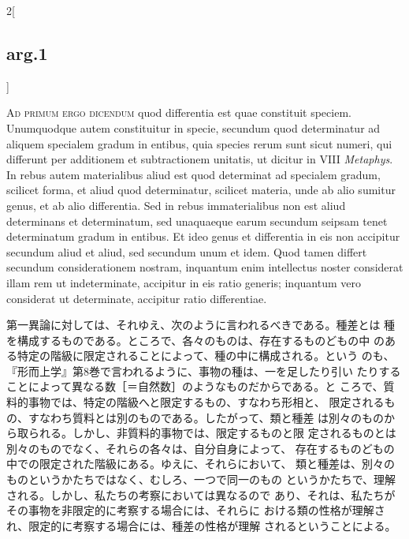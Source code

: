 \documentclass[paper=a4paper,fontsize=10pt,jafontsize=9pt,titlepage]{jlreq}
\begin{document}
\begin{paracol}{2}[\subsection{arg.1}]
\switchcolumn*[\subsection{ad.1}]

{\scshape Ad primum ergo dicendum} quod differentia est quae
 constituit speciem. Unumquodque autem constituitur in specie,
 secundum quod determinatur ad aliquem specialem gradum in entibus,
 quia species rerum sunt sicut numeri, qui differunt per additionem et
 subtractionem unitatis, ut dicitur in VIII {\itshape Metaphys}. In
 rebus autem materialibus aliud est quod determinat ad specialem
 gradum, scilicet forma, et aliud quod determinatur, scilicet materia,
 unde ab alio sumitur genus, et ab alio differentia. Sed in rebus
 immaterialibus non est aliud determinans et determinatum, sed
 unaquaeque earum secundum seipsam tenet determinatum gradum in
 entibus. Et ideo genus et differentia in eis non accipitur secundum
 aliud et aliud, sed secundum unum et idem. Quod tamen differt
 secundum considerationem nostram, inquantum enim intellectus noster
 considerat illam rem ut indeterminate, accipitur in eis ratio
 generis; inquantum vero considerat ut determinate, accipitur ratio
 differentiae.

\switchcolumn

第一異論に対しては、それゆえ、次のように言われるべきである。種差とは
 種を構成するものである。ところで、各々のものは、存在するものどもの中
 のある特定の階級に限定されることによって、種の中に構成される。という
 のも、『形而上学』第8巻で言われるように、事物の種は、一を足したり引い
 たりすることによって異なる数［＝自然数］のようなものだからである。と
 ころで、質料的事物では、特定の階級へと限定するもの、すなわち形相と、
 限定されるもの、すなわち質料とは別のものである。したがって、類と種差
 は別々のものから取られる。しかし、非質料的事物では、限定するものと限
 定されるものとは別々のものでなく、それらの各々は、自分自身によって、
 存在するものどもの中での限定された階級にある。ゆえに、それらにおいて、
 類と種差は、別々のものというかたちではなく、むしろ、一つで同一のもの
 というかたちで、理解される。しかし、私たちの考察においては異なるので
 あり、それは、私たちがその事物を非限定的に考察する場合には、それらに
 おける類の性格が理解され、限定的に考察する場合には、種差の性格が理解
 されるということによる。

\switchcolumn*[\subsection{ad.2}]


\end{paracol}
\end{document}
